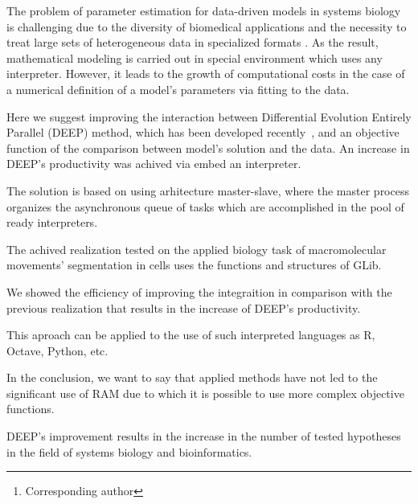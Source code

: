 \documentclass[12pt, a4paper]{article} %
\begin{document}

\renewcommand{\abstractname}{\large \textbf{\uppercase{
    Deep: optimizer with embedded interpreter\\
}}}
\begin{abstract}
    \normalsize %
    \bigskip %
    \noindent A.~V.~Svichkarev\footnote[*]{Corresponding author}, K.~N.~Kozlov \\
    \noindent
    System biology and bioinformatics lab, IAMM,
    Peter the Great St.Petersburg Polytechnic University,
St.Petersburg, Russia \\
    \noindent e-mail: tolik0393@bionet.nsc.ru \\
\end{abstract}

The problem of parameter estimation
for data-driven models in systems biology
is challenging due to the diversity
of biomedical applications and
the necessity to treat large sets of
heterogeneous data in specialized formats \cite{mendes1998non}.
As the result, mathematical modeling
is carried out in special environment
which uses any interpreter.
However, it leads to the growth
of computational costs
in the case of a numerical definition
of a model's parameters
via fitting to the data.

Here we suggest improving
the interaction between
Differential Evolution Entirely Parallel (DEEP) method,
which has been developed recently~\cite{Kozlov11},
and an objective function
of the comparison between
model's solution and the data.
An increase in DEEP's productivity
was achived via embed an interpreter.

The solution is based on using
arhitecture master-slave,
where the master process
organizes the asynchronous queue
of tasks which are accomplished
in the pool of ready interpreters.

The achived realization tested
on the applied biology task
of macromolecular movements'
segmentation in cells
uses the functions and structures
of GLib.

We showed the efficiency
of improving the integraition
in comparison with the
previous realization
that results in the increase
of DEEP's productivity.

This aproach can be applied
to the use of such interpreted
languages as R, Octave, Python, etc.

In the conclusion,
we want to say
that applied methods have not
led to the significant use of RAM
due to which it is possible to use
more complex objective functions.

DEEP's improvement results in
the increase in the number of
tested hypotheses
in the field of systems biology
and bioinformatics.

\vfill %
\end{document}
